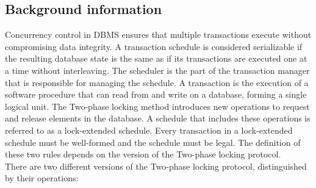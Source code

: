 \documentclass{article}
\begin{document}
\subsection{Background information}
Concurrency control in DBMS ensures that multiple transactions execute without compromising data integrity. A transaction schedule is considered serializable if the resulting database state is the same as if its transactions are executed one at a time without interleaving. 
The scheduler is the part of the transaction manager that is responsible for managing the schedule.
A transaction is the execution of a software procedure that can read from and write on a database, forming a single logical unit. The Two-phase locking method introduces new operations to request and release elements in the database. A schedule that includes these operations is referred to as a lock-extended schedule. Every transaction in a lock-extended schedule must be well-formed and the schedule must be legal. The definition of these two rules depends on the version of the Two-phase locking protocol.
\\
There are two different versions of the Two-phase locking protocol, distinguished by their operations:
\end{document}
